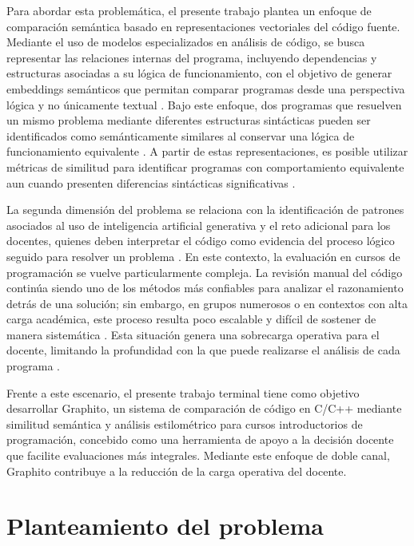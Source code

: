 Para abordar esta problemática, el presente trabajo plantea un enfoque de comparación semántica basado en representaciones vectoriales del código fuente. Mediante el uso de modelos especializados en análisis de código, se busca representar las relaciones internas del programa, incluyendo dependencias y estructuras asociadas a su lógica de funcionamiento, con el objetivo de generar embeddings semánticos que permitan comparar programas desde una perspectiva lógica y no únicamente textual \cite{Mekterovic2023Scaling}. Bajo este enfoque, dos programas que resuelven un mismo problema mediante diferentes estructuras sintácticas pueden ser identificados como semánticamente similares al conservar una lógica de funcionamiento equivalente \cite{WeberWulff2023Testing}. A partir de estas representaciones, es posible utilizar métricas de similitud para identificar programas con comportamiento equivalente aun cuando presenten diferencias sintácticas significativas \cite{WeberWulff2023Testing}.

La segunda dimensión del problema se relaciona con la identificación de patrones asociados al uso de inteligencia artificial generativa y el reto adicional para los docentes, quienes deben interpretar el código como evidencia del proceso lógico seguido para resolver un problema \cite{Shen2026Skill}. En este contexto, la evaluación en cursos de programación se vuelve particularmente compleja. La revisión manual del código continúa siendo uno de los métodos más confiables para analizar el razonamiento detrás de una solución; sin embargo, en grupos numerosos o en contextos con alta carga académica, este proceso resulta poco escalable y difícil de sostener de manera sistemática \cite{Shen2026Skill}. Esta situación genera una sobrecarga operativa para el docente, limitando la profundidad con la que puede realizarse el análisis de cada programa \cite{Shen2026Skill}.

Frente a este escenario, el presente trabajo terminal tiene como objetivo desarrollar Graphito, un sistema de comparación de código en C/C++ mediante similitud semántica y análisis estilométrico para cursos introductorios de programación, concebido como una herramienta de apoyo a la decisión docente que facilite evaluaciones más integrales. Mediante este enfoque de doble canal, Graphito contribuye a la reducción de la carga operativa del docente.



\section{Planteamiento del problema}

